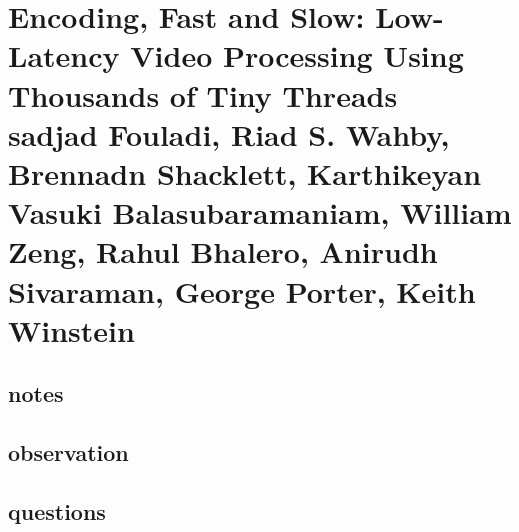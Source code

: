 \section{Encoding, Fast and Slow: Low-Latency Video Processing Using Thousands of Tiny Threads \\ \small{sadjad Fouladi, Riad S. Wahby, Brennadn Shacklett, Karthikeyan Vasuki Balasubaramaniam, William Zeng, Rahul Bhalero, Anirudh Sivaraman, George Porter, Keith Winstein}}

\subsection{notes}

\subsection{observation}

\subsection{questions}

\begin{itemize}

\end{itemize}
